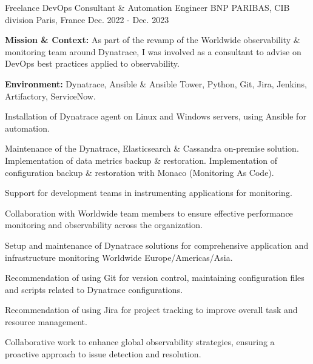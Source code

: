 \begin{cventries}
\cventry
{Freelance DevOps Consultant \& Automation Engineer} %
{BNP PARIBAS, CIB division} %
{Paris, France} %
{Dec. 2022 - Dec. 2023} %
{
  \begin{cvitems}
    \item {\textbf{Mission \& Context:} As part of the revamp of the Worldwide observability \& monitoring team around Dynatrace, I was involved as a consultant to advise on DevOps best practices applied to observability.}
    \item {\textbf{Environment:} Dynatrace, Ansible \& Ansible Tower, Python, Git, Jira, Jenkins, Artifactory, ServiceNow.}
    \item {Installation of Dynatrace agent on Linux and Windows servers, using Ansible for automation.}
    \item {Maintenance of the Dynatrace, Elasticsearch \& Cassandra on-premise solution. Implementation of data metrics backup \& restoration. Implementation of configuration backup \& restoration with Monaco (Monitoring As Code).}
    \item {Support for development teams in instrumenting applications for monitoring.}
    \item {Collaboration with Worldwide team members to ensure effective performance monitoring and observability across the organization.}
    \item {Setup and maintenance of Dynatrace solutions for comprehensive application and infrastructure monitoring Worldwide Europe/Americas/Asia.}
    \item {Recommendation of using Git for version control, maintaining configuration files and scripts related to Dynatrace configurations.}
    \item {Recommendation of using Jira for project tracking to improve overall task and resource management.}
    \item {Collaborative work to enhance global observability strategies, ensuring a proactive approach to issue detection and resolution.}
  \end{cvitems}
}


\end{cventries}
